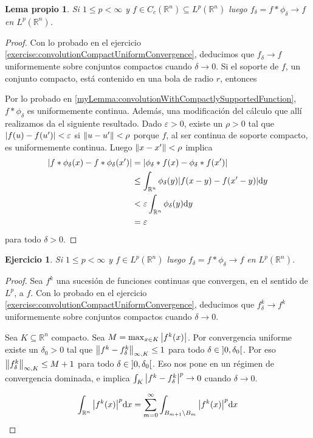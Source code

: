 \documentclass{article}
\newcommand{\realNumbers}{\mathbb{R}}
\newtheorem{exercise}{Ejercicio}
\newtheorem{myLemma}{Lema propio}
\newcommand{\leftOpenInterval}{\left]}
\newcommand{\rightOpenInterval}{\right[}
\newcommand{\leftClosedInterval}{\left[}
\newcommand{\rightClosedInterval}{\right]}
\newcommand{\interval}[3]{%
  \ifstrequal{#1}{oo}{%
    \leftOpenInterval #2, #3 \rightOpenInterval%
  }{%
    \ifstrequal{#1}{co}{%
      \leftClosedInterval #2, #3 \rightOpenInterval%
    }{%
      \ifstrequal{#1}{oc}{
        \leftOpenInterval #2, #3 \rightClosedInterval%
      }{%
        \ifstrequal{#1}{cc}{
          \leftClosedInterval #2, #3 \rightClosedInterval
        }{%
        }%
      }%
    }%
  }%
}
\theoremstyle{remark}
\begin{document}
\begin{myLemma}
  Si \(1 \leq p < \infty\) y \(f \in C_c(\realNumbers^n) \subseteq L^p(\realNumbers^n)\) luego \(f_{\delta} = f * \phi_{\delta} \rightarrow f\) en \(L^p(\realNumbers^n)\).
\end{myLemma}
\begin{proof}
  Con lo probado en el ejercicio \ref{exercise:convolutionCompactUniformConvergence}, deducimos que \(f_{\delta} \rightarrow f\) uniformemente sobre conjuntos compactos cuando \(\delta \rightarrow 0\).
  Si el soporte de \(f\), un conjunto compacto, está contenido en una bola de radio \(r\), entonces

  Por lo probado en \ref{myLemma:convolutionWithCompactlySupportedFunction}, \(f * \phi_{\delta}\) es uniformemente continua.
  Además, una modificación del cálculo que allí realizamos da el siguiente resultado.
  Dado \(\varepsilon > 0\), existe un \(\rho > 0\) tal que \(\abs{f(u) - f(u')} < \varepsilon\) si \(\norm{u - u'} < \rho\) porque \(f\), al ser continua de soporte compacto, es uniformemente continua.
  Luego \(\norm{x - x'} < \rho\) implica
  \begin{align}
    \abs{f * \phi_{\delta} (x) - f * \phi_{\delta} (x')}
    &=
    \abs{\phi_{\delta} * f (x) - \phi_{\delta} * f (x')}
    \\
    &\leq
    \int_{\realNumbers^n} \phi_{\delta}(y) \abs{f(x - y) - f(x' - y)} \dd y
    \\
    &<
    \varepsilon \int_{\realNumbers^n} \phi_{\delta}(y) \dd y
    \\
    &=
    \varepsilon
  \end{align}
  para todo \(\delta > 0\).
\end{proof}

\begin{exercise}
  Si \(1 \leq p < \infty\) y \(f \in L^p(\realNumbers^n)\) luego \(f_{\delta} = f * \phi_{\delta} \rightarrow f\) en \(L^p(\realNumbers^n)\).
\end{exercise}
\begin{proof}
  Sea \(f^k\) una sucesión de funciones continuas que convergen,  en el sentido de \(L^p\), a \(f\).
  Con lo probado en el ejercicio \ref{exercise:convolutionCompactUniformConvergence}, deducimos que \(f^k_{\delta} \rightarrow f^k\) uniformemente sobre conjuntos compactos cuando \(\delta \rightarrow 0\).
  
  Sea \(K \subseteq \realNumbers^n\) compacto.
  Sea \(M = \max_{x \in K} \abs{f^k(x)}\).
  Por convergencia uniforme existe un \(\delta_0 > 0\) tal que \(\norm{f^k - f^k_\delta}_{\infty, K} \leq 1\) para todo \(\delta \in \interval{oo}{0}{\delta_0}\).
  Por eso \(\norm{f^k_{\delta}}_{\infty, K} \leq M + 1\) para todo \(\delta \in \interval{oo}{0}{\delta_0}\).
  Eso nos pone en un régimen de convergencia dominada, e implica \(\int_K \abs{f^k - f^k_{\delta}}^p \rightarrow 0\) cuando \(\delta \rightarrow 0\).

  \begin{align}
    \int_{\realNumbers^n} \abs{f^k(x)}^p \dd x
    =
    \sum_{m = 0}^{\infty} \int_{B_{m + 1} \setminus B_m} \abs{f^k(x)}^p \dd x
  \end{align}
  
\end{proof}
\end{document}
